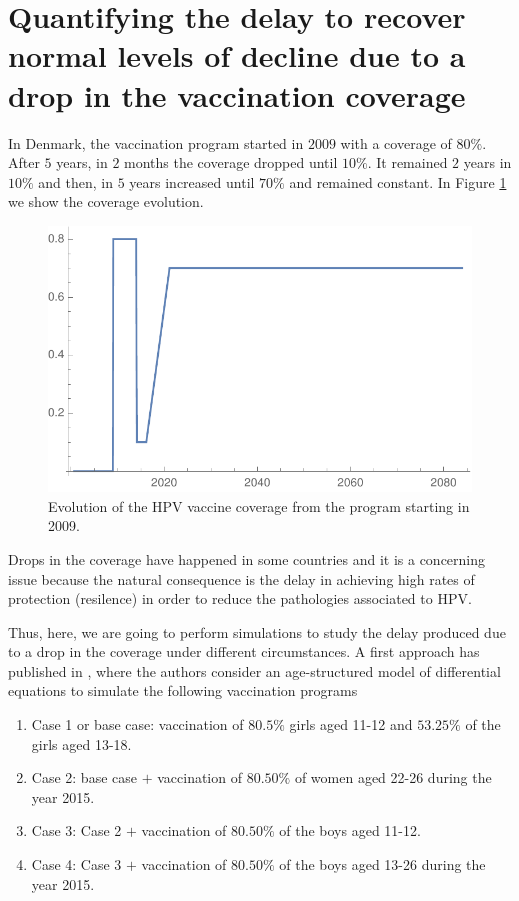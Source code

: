 \section{Quantifying the delay to recover normal levels of decline due to a drop in the vaccination coverage}\label{Resilence}
In Denmark, the vaccination program started in $2009$ with a coverage of $80\%$. After $5$ years, in $2$ months the coverage dropped until $10\%$. It remained $2$ years in $10\%$ and then, in $5$ years increased until $70\%$ and remained constant. In Figure \ref{fig:cobertura_danesa} we show the coverage evolution. 

\begin{figure}[h!]
	\centering
	\includegraphics[width=0.5\linewidth]{IMGs/11.-Resilencia/Cobertura_Danesa.pdf}
	\caption{Evolution of the HPV vaccine coverage from the program starting in 2009.}
	\label{fig:cobertura_danesa}
\end{figure}

Drops in the coverage have happened in some countries and it is a concerning issue because the natural consequence is the delay in achieving high rates of protection (resilence) in order to reduce the pathologies associated to HPV.

Thus, here, we are going to perform simulations to study the delay produced due to a drop in the coverage under different circumstances. A first approach has published in \cite{Elfstrm2015}, where the authors consider an age-structured model of differential equations \cite{Baussano2013} to simulate the following vaccination programs

\begin{enumerate}
	\item Case 1 or base case: vaccination of $80.5\%$ girls aged 11-12 and $53.25\%$ of the girls aged 13-18.
	\item Case 2: base case $+$ vaccination of $80.50\%$ of women aged 22-26 during the year 2015.
	\item Case 3: Case 2 $+$ vaccination of $80.50\%$ of the boys aged 11-12.
	\item Case 4: Case 3 $+$ vaccination of $80.50\%$ of the boys aged 13-26 during the year 2015.
\end{enumerate}

